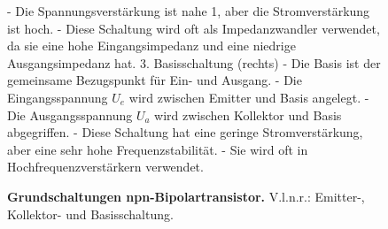 {\begin{figure}[H]
\begin{minipage}[c]{0.36\textwidth}
{            - Die Spannungsverstärkung ist nahe 1, aber die Stromverstärkung ist hoch.  
            - Diese Schaltung wird oft als Impedanzwandler verwendet, da sie eine hohe Eingangsimpedanz und eine niedrige Ausgangsimpedanz hat.  
            3. Basisschaltung (rechts)
            - Die Basis ist der gemeinsame Bezugspunkt für Ein- und Ausgang.  
            - Die Eingangsspannung \( U_e \) wird zwischen Emitter und Basis angelegt.  
            - Die Ausgangsspannung \( U_a \) wird zwischen Kollektor und Basis abgegriffen.  
            - Diese Schaltung hat eine geringe Stromverstärkung, aber eine sehr hohe Frequenzstabilität.  
            - Sie wird oft in Hochfrequenzverstärkern verwendet.}
        \end{minipage}
    \caption{\textbf{Grundschaltungen npn-Bipolartransistor.} V.l.n.r.: Emitter-, Kollektor- und Basisschaltung.}  
    \label{fig:GrundschaltungenBipolartransistor}
\end{figure}}





